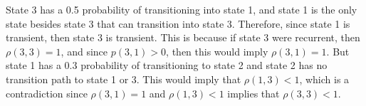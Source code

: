 \documentclass{article}
\begin{document}
State 3 has a 0.5 probability of transitioning into state 1, and state 1 is the only state besides state 3 that can transition into state 3. Therefore, since state 1 is transient, then state 3 is transient. This is because if state 3 were recurrent, then $\rho(3,3) = 1$, and since $p(3,1) > 0$, then this would imply $\rho(3,1) = 1$. But state 1 has a 0.3 probability of transitioning to state 2 and state 2 has no transition path to state 1 or 3. This would imply that $\rho(1,3) < 1$, which is a contradiction since $\rho(3,1) = 1$ and $\rho(1,3) < 1$ implies that $\rho(3,3) < 1$.                                                                                                                                                                                                                                                                                                                                                                                                                                                                                                                                                                                                                                                                                                                                                                                                                                                                                                                                                                                                                                                                                                                                                                                                                                                                                                                                                                                                                                                                                                                                                                                                                                                                                                                                                                                                                                                                                                                                                                                                                                                                                                                                                                                                                                                                                                                                                                                                                                                                                                                                                                                                                                                                                                                                                                                                                                                                
\end{document}
